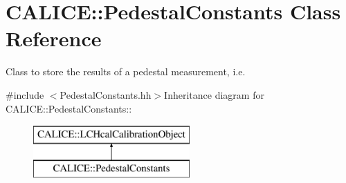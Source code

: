 \section{CALICE::PedestalConstants Class Reference}
\label{classCALICE_1_1PedestalConstants}


Class to store the results of a pedestal measurement, i.e.  


{\ttfamily \#include $<$PedestalConstants.hh$>$}Inheritance diagram for CALICE::PedestalConstants::\begin{figure}[H]
\begin{center}
\leavevmode
\includegraphics[height=2cm]{classCALICE_1_1PedestalConstants}
\end{center}
\end{figure}
